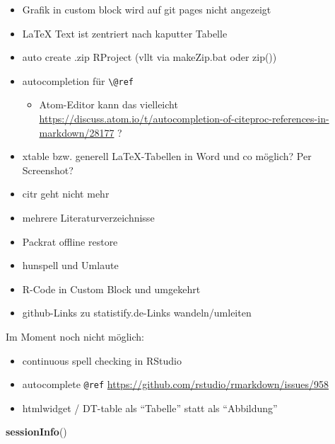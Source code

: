 \documentclass[]{book}
\makeatletter
\newenvironment{Shaded}{\begin{snugshade}}{\end{snugshade}}
\newcommand{\KeywordTok}[1]{\textcolor[rgb]{0.13,0.29,0.53}{\textbf{{#1}}}}
\newcommand{\NormalTok}[1]{{#1}}
\providecommand{\tightlist}{%
  \setlength{\itemsep}{0pt}\setlength{\parskip}{0pt}}
\newenvironment{kframe}{%
\medskip{}
\setlength{\fboxsep}{.8em}
 \def\at@end@of@kframe{}%
 \ifinner\ifhmode%
  \def\at@end@of@kframe{\end{minipage}}%
  \begin{minipage}{\columnwidth}%
 \fi\fi%
 \def\FrameCommand##1{\hskip\@totalleftmargin \hskip-\fboxsep
 \colorbox{shadecolor}{##1}\hskip-\fboxsep
     \hskip-\linewidth \hskip-\@totalleftmargin \hskip\columnwidth}%
 \MakeFramed {\advance\hsize-\width
   \@totalleftmargin\z@ \linewidth\hsize
   \@setminipage}}%
 {\par\unskip\endMakeFramed%
 \at@end@of@kframe}
\renewenvironment{Shaded}{\begin{kframe}}{\end{kframe}}
\theoremstyle{definition}
\theoremstyle{definition}
\theoremstyle{remark}
\makeatother
\begin{document}
\begin{itemize}
\tightlist
\item
  Grafik in custom block wird auf git pages nicht angezeigt
\item
  LaTeX Text ist zentriert nach kaputter Tabelle
\item
  auto create .zip RProject (vllt via makeZip.bat oder zip())
\item
  autocompletion für \texttt{\textbackslash{}@ref}

  \begin{itemize}
  \tightlist
  \item
    Atom-Editor kann das vielleicht
    \url{https://discuss.atom.io/t/autocompletion-of-citeproc-references-in-markdown/28177}
    ?
  \end{itemize}
\item
  xtable bzw. generell LaTeX-Tabellen in Word und co möglich? Per
  Screenshot?
\item
  citr geht nicht mehr
\item
  mehrere Literaturverzeichnisse
\item
  Packrat offline restore
\item
  hunspell und Umlaute
\item
  R-Code in Custom Block und umgekehrt
\item
  github-Links zu statistify.de-Links wandeln/umleiten
\end{itemize}

Im Moment noch nicht möglich:

\begin{itemize}
\tightlist
\item
  continuous spell checking in RStudio
\item
  autocomplete \texttt{@ref}
  \url{https://github.com/rstudio/rmarkdown/issues/958}
\item
  htmlwidget / DT-table als ``Tabelle'' statt als ``Abbildung''
\end{itemize}

\begin{Shaded}
\begin{Highlighting}[]
\KeywordTok{sessionInfo}\NormalTok{()}
\end{Highlighting}
\end{Shaded}
\end{document}

